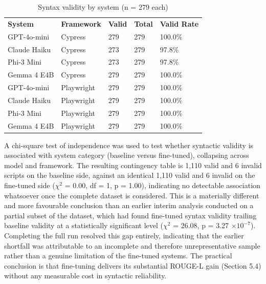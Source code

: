 \begin{longtable}[]{@{}lllll@{}}
\caption{Syntax validity by system (n = 279 each)}\tabularnewline
\toprule
\endhead
\textbf{System} & \textbf{Framework} & \textbf{Valid} & \textbf{Total} &
\textbf{Valid Rate} \\
GPT-4o-mini & Cypress & 279 & 279 & 100.0\% \\
Claude Haiku & Cypress & 273 & 279 & 97.8\% \\
Phi-3 Mini & Cypress & 273 & 279 & 97.8\% \\
Gemma 4 E4B & Cypress & 279 & 279 & 100.0\% \\
GPT-4o-mini & Playwright & 279 & 279 & 100.0\% \\
Claude Haiku & Playwright & 279 & 279 & 100.0\% \\
Phi-3 Mini & Playwright & 279 & 279 & 100.0\% \\
Gemma 4 E4B & Playwright & 279 & 279 & 100.0\% \\
\bottomrule
\end{longtable}

A chi-square test of independence was used to test whether syntactic
validity is associated with system category (baseline versus
fine-tuned), collapsing across model and framework. The resulting
contingency table is 1,110 valid and 6 invalid scripts on the baseline
side, against an identical 1,110 valid and 6 invalid on the fine-tuned
side ($\chi^2$ = 0.00, df = 1, p = 1.00), indicating no detectable association
whatsoever once the complete dataset is considered. This is a materially
different and more favourable conclusion than an earlier interim
analysis conducted on a partial subset of the dataset, which had found
fine-tuned syntax validity trailing baseline validity at a statistically
significant level ($\chi^2$ = 26.08, p = 3.27 $\times 10^{-7}$). Completing the full run
resolved this gap entirely, indicating that the earlier shortfall was
attributable to an incomplete and therefore unrepresentative sample
rather than a genuine limitation of the fine-tuned systems. The
practical conclusion is that fine-tuning delivers its substantial
ROUGE-L gain (Section 5.4) without any measurable cost in syntactic
reliability.


